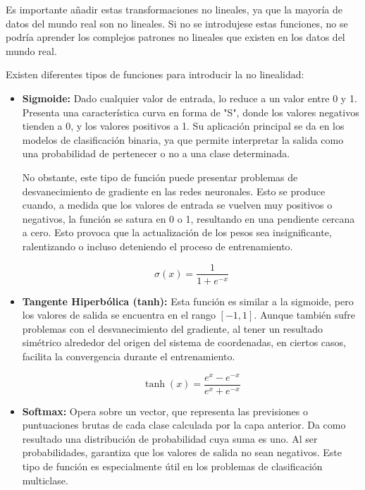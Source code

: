 \documentclass[11pt, a4paper]{article}
\numberwithin{equation}{section}
\begin{document}
Es importante añadir estas transformaciones no lineales, ya que la mayoría de datos del mundo real son no lineales. Si no se introdujese estas funciones, no se podría aprender los complejos patrones no lineales que existen en los datos del mundo real.

Existen diferentes tipos de funciones para introducir la no linealidad:

\begin{itemize}
\item \textbf{Sigmoide:} Dado cualquier valor de entrada, lo reduce a un valor entre 0 y 1. Presenta una característica curva en forma de "S", donde los valores negativos tienden a 0, y los valores positivos a 1. Su aplicación principal se da en los modelos de clasificación binaria, ya que permite interpretar la salida como una probabilidad de pertenecer o no a una clase determinada.

No obstante, este tipo de función puede presentar problemas de desvanecimiento de gradiente en las redes neuronales. Esto se produce cuando, a medida que los valores de entrada se vuelven muy positivos o negativos, la función se satura en 0 o 1, resultando en una pendiente cercana a cero. Esto provoca que la actualización de los pesos sea insignificante, ralentizando o incluso deteniendo el proceso de entrenamiento.

\begin{equation}
\label{eq:sigmoide}
\sigma(x) = \frac{1}{1 + e^{-x}}
\end{equation}

\item \textbf{Tangente Hiperbólica (tanh):} Esta función es similar a la sigmoide, pero los valores de salida se encuentra en el rango $[-1, 1]$. Aunque también sufre problemas con el desvanecimiento del gradiente, al tener un resultado simétrico alrededor del origen del sistema de coordenadas, en ciertos casos, facilita la convergencia durante el entrenamiento.

\begin{equation}
\label{eq:tanh}
\tanh(x) = \frac{e^{x} - e^{-x}}{e^{x} + e^{-x}}
\end{equation}

\item \textbf{Softmax:} Opera sobre un vector, que representa las previsiones o puntuaciones brutas de cada clase calculada por la capa anterior. Da como resultado una distribución de probabilidad cuya suma es uno. Al ser probabilidades, garantiza que los valores de salida no sean negativos. Este tipo de función es especialmente útil en los problemas de clasificación multiclase.


\end{itemize}
\end{document}
